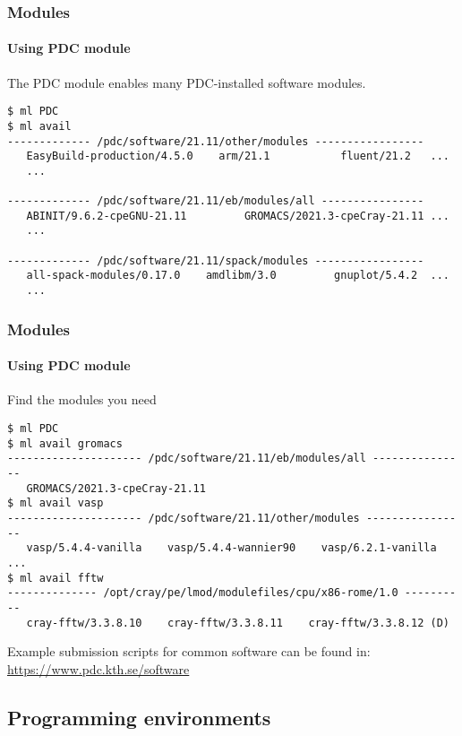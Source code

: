 \begin{frame}[fragile]
\frametitle{Modules}
\framesubtitle{Using PDC module}
\begin{exampleblock}{
The PDC module enables many PDC-installed software modules.
}
\footnotesize
\begin{verbatim}
$ ml PDC
$ ml avail
------------- /pdc/software/21.11/other/modules -----------------
   EasyBuild-production/4.5.0    arm/21.1           fluent/21.2   ...
   ...

------------- /pdc/software/21.11/eb/modules/all ----------------
   ABINIT/9.6.2-cpeGNU-21.11         GROMACS/2021.3-cpeCray-21.11 ...
   ...

------------- /pdc/software/21.11/spack/modules -----------------
   all-spack-modules/0.17.0    amdlibm/3.0         gnuplot/5.4.2  ...
   ...

\end{verbatim}
\end{exampleblock}
\end{frame}



\begin{frame}[fragile]
\frametitle{Modules}
\framesubtitle{Using PDC module}
\begin{exampleblock}{Find the modules you need}
\footnotesize
\begin{verbatim}
$ ml PDC
$ ml avail gromacs
--------------------- /pdc/software/21.11/eb/modules/all ---------------
   GROMACS/2021.3-cpeCray-21.11
$ ml avail vasp
--------------------- /pdc/software/21.11/other/modules ----------------
   vasp/5.4.4-vanilla    vasp/5.4.4-wannier90    vasp/6.2.1-vanilla  ...
$ ml avail fftw
-------------- /opt/cray/pe/lmod/modulefiles/cpu/x86-rome/1.0 ----------
   cray-fftw/3.3.8.10    cray-fftw/3.3.8.11    cray-fftw/3.3.8.12 (D)
\end{verbatim}
\end{exampleblock}

Example submission scripts for common software can be found in:
\href{https://www.pdc.kth.se/software}{https://www.pdc.kth.se/software}
\end{frame}



\subsection{Programming environments}

